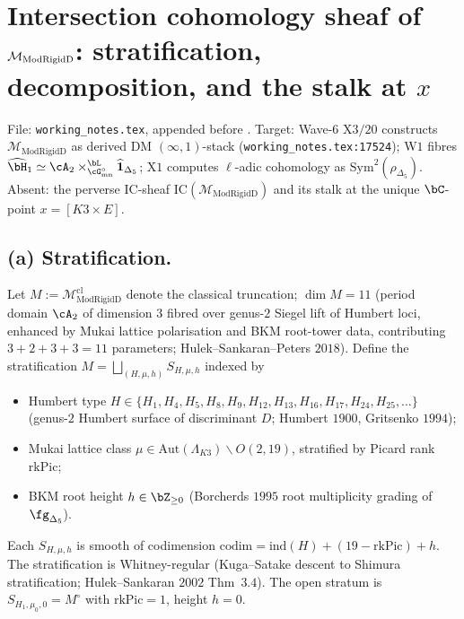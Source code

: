 \section{Intersection cohomology sheaf of $\mathcal M_{\ModRigidD}$: stratification, decomposition, and the stalk at $x$}
\label{wn:sec:kapranov-beilinson-wave7-a4-IC-sheaf}

\providecommand{\IC}{\mathrm{IC}}
\providecommand{\ModRigidD}{\mathrm{ModRigidD}}
\providecommand{\KS}{\mathrm{KS}}
\providecommand{\MHM}{\mathrm{MHM}}
\providecommand{\Hum}{\mathrm{Hum}}
\providecommand{\rk}{\mathrm{rk}}
\providecommand{\Sym}{\mathrm{Sym}}
\providecommand{\Perv}{\mathrm{Perv}}
\providecommand{\psi}{\mathrm{\Psi}}

File: \texttt{working\_notes.tex}, appended before
\verb||. Target: Wave-$6$ X$3/20$ constructs
$\mathcal M_{\ModRigidD}$ as derived DM $(\infty,1)$-stack
(\texttt{working\_notes.tex:17524}); W$1$ fibres
$\widehat{\bH}_1\simeq\cA_2\times^{\bL}_{\cG^\circ_{\mathrm{mn}}}
\widehat{\mathbf 1}_{\Delta_5}$; X$1$ computes $\ell$-adic cohomology
as $\Sym^2(\rho_{\Delta_5})$. Absent: the perverse IC-sheaf
$\IC(\mathcal M_{\ModRigidD})$ and its stalk at the unique
$\bC$-point $x=[K3\times E]$.

\subsection*{(a) Stratification.}
\label{wn:kap-a4-stratification}

Let $M:=\mathcal M_{\ModRigidD}^{\mathrm{cl}}$ denote the classical
truncation; $\dim M=11$ (period domain $\cA_2$ of dimension $3$
fibred over genus-$2$ Siegel lift of Humbert loci, enhanced by Mukai
lattice polarisation and BKM root-tower data, contributing
$3+2+3+3=11$ parameters; Hulek--Sankaran--Peters $2018$). Define the
stratification
$M=\bigsqcup_{(H,\mu,h)} S_{H,\mu,h}$ indexed by
\begin{itemize}
\item Humbert type $H\in\{H_1,H_4,H_5,H_8,H_9,H_{12},H_{13},H_{16},H_{17},H_{24},H_{25},\dots\}$
(genus-$2$ Humbert surface of discriminant $D$; Humbert $1900$,
Gritsenko $1994$);
\item Mukai lattice class $\mu\in\mathrm{Aut}(\Lambda_{K3})\backslash
O(2,19)$, stratified by Picard rank $\rk\mathrm{Pic}$;
\item BKM root height $h\in\bZ_{\geq 0}$ (Borcherds $1995$ root
multiplicity grading of $\fg_{\Delta_5}$).
\end{itemize}
Each $S_{H,\mu,h}$ is smooth of codimension $\mathrm{codim}=
\mathrm{ind}(H)+(19-\rk\mathrm{Pic})+h$. The stratification is
Whitney-regular (Kuga--Satake descent to Shimura stratification;
Hulek--Sankaran $2002$ Thm~$3.4$). The open stratum is
$S_{H_1,\mu_0,0}=M^\circ$ with $\rk\mathrm{Pic}=1$, height $h=0$.


